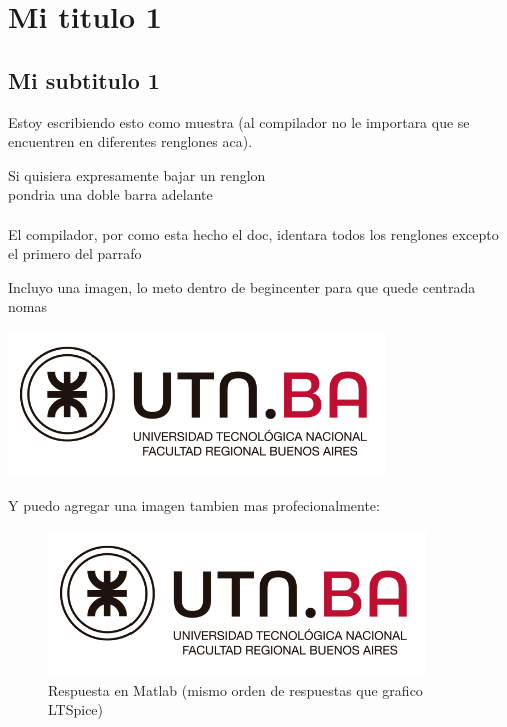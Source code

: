 \documentclass[a4paper,12pt]{article}
\begin{document}
\section{Mi titulo 1}

    \subsection{Mi subtitulo 1}

        Estoy escribiendo esto como muestra
        (al compilador no le importara que se encuentren en diferentes renglones aca).

        Si quisiera expresamente bajar un renglon
        \\ pondria una doble barra adelante
        \\
        \\ El compilador, por como esta hecho el doc, identara todos los renglones excepto el primero del parrafo

        Incluyo una imagen, lo meto dentro de begin{center} para que quede centrada nomas
        \begin{center}
            \includegraphics[width=100mm]{./Logo_UTN.png}
        \end{center}

        Y puedo agregar una imagen tambien mas profecionalmente:
        \begin{figure}[H]
            \centering
		    \captionsetup{labelformat=empty}
            \includegraphics[width=100mm]{./Logo_UTN.png}
            \caption{Respuesta en Matlab (mismo orden de respuestas que grafico LTSpice)}
        \end{figure}
\end{document}
